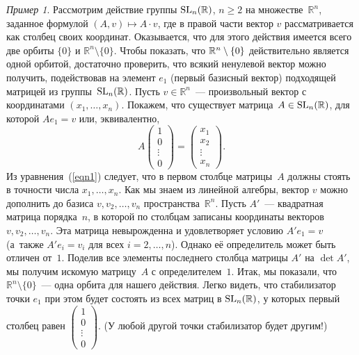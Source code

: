 \documentclass[a4paper,10pt]{amsart}
\def\RR{{\mathbb R}}%
\def\SL{{\rm SL}}%
\def\SL{{\rm SL}}
\theoremstyle{definition}
\theoremstyle{remark}
\newtheorem{example}{Пример}
\begin{document}
\begin{example}
Рассмотрим действие группы $\SL_n(\RR)$, $n \geqslant 2$ на
множестве~$\RR^n$, заданное формулой $(A, v) \mapsto A \cdot v$, где
в правой части вектор $v$ рассматривается как столбец своих
координат. Оказывается, что для этого действия имеется всего две
орбиты $\lbrace 0 \rbrace$ и $\RR^n \setminus \lbrace 0 \rbrace$.
Чтобы показать, что $\RR^n \setminus\nobreak \lbrace 0 \rbrace$
действительно является одной орбитой, достаточно проверить, что
всякий ненулевой вектор можно получить, подействовав на элемент
$e_1$ (первый базисный вектор) подходящей матрицей из
группы~$\SL_n(\RR)$. Пусть $v \in \RR^n$~--- произвольный вектор с
координатами $(x_1, \ldots, x_n)$. Покажем, что существует
матрица~$A \in \SL_n(\RR)$, для которой $Ae_1 = v$ или,
эквивалентно,
\begin{equation} \label{eqn1}
A\begin{pmatrix} 1 \\ 0 \\ \vdots \\ 0 \end{pmatrix} =
\begin{pmatrix} x_1\\ x_2 \\ \vdots \\ x_n \end{pmatrix}.
\end{equation}
Из уравнения~(\ref{eqn1}) следует, что в первом столбце матрицы~$A$
должны стоять в точности числа $x_1, \ldots, x_n$. Как мы знаем из
линейной алгебры, вектор $v$ можно дополнить до базиса $v, v_2,
\ldots, v_n$ пространства~$\RR^n$. Пусть $A'$~--- квадратная матрица
порядка~$n$, в которой по столбцам записаны координаты векторов $v,
v_2, \ldots, v_n$. Эта матрица невырожденна и удовлетворяет условию
$A'e_1 = v$ (а~также $A'e_i = v_i$ для всех $i = 2, \ldots, n$).
Однако её определитель может быть отличен от~$1$. Поделив все
элементы последнего столбца матрицы $A'$ на $\det A'$, мы получим
искомую матрицу~$A$ с определителем~$1$. Итак, мы показали, что
$\RR^n \setminus \lbrace 0 \rbrace$~--- одна орбита для нашего
действия. Легко видеть, что стабилизатор точки $e_1$ при этом будет
состоять из всех матриц в $\SL_n(\RR)$, у которых первый столбец
равен $\begin{pmatrix} 1 \\ 0 \\ \vdots \\ 0 \end{pmatrix}$. (У
любой другой точки стабилизатор будет другим!)
\end{example}
\end{document}
